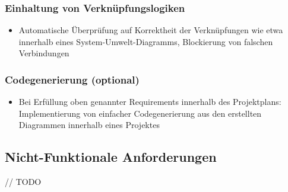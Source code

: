 \subsubsection{Einhaltung von Verknüpfungslogiken}
\begin{itemize}
	\item Automatische Überprüfung auf Korrektheit der Verknüpfungen wie etwa innerhalb eines System-Umwelt-Diagramms, Blockierung von falschen Verbindungen  
\end{itemize}

\subsubsection{Codegenerierung (optional)}
\begin{itemize}
	\item Bei Erfüllung oben genannter Requirements innerhalb des Projektplans: Implementierung von einfacher Codegenerierung aus den erstellten Diagrammen innerhalb eines Projektes
\end{itemize}
	
\subsection{Nicht-Funktionale Anforderungen}

// TODO